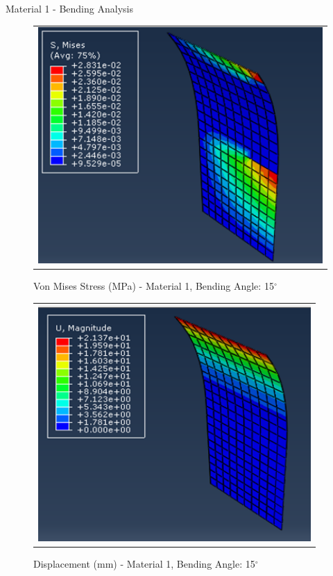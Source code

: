 \documentclass[a4paper,12pt]{article}
\numberwithin{equation}{section}
\numberwithin{figure}{section}
\begin{document}

\newpage
\noindent Material 1 - Bending Analysis 
\begin{figure}[H]
  \centering
  \begin{tabular}{@{}c@{}}
    \includegraphics[width=0.7\linewidth,height=255pt]{Results/Bending/M1_VMS_15.png} \\
  \end{tabular}
  \caption{Von Mises Stress (MPa) - Material 1,  Bending Angle: 15$^{\circ}$ }
\end{figure}

\begin{figure}[H]
  \centering
  \begin{tabular}{@{}c@{}}
    \includegraphics[width=0.7\linewidth,height=255pt]{Results/Bending/M1_DIS_15.png} \\
  \end{tabular}
  \caption{Displacement (mm) - Material 1,  Bending Angle: 15$^{\circ}$ }
\end{figure}
\end{document}

